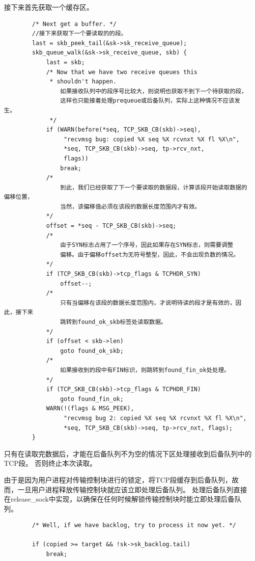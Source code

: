     接下来首先获取一个缓存区。
\begin{verbatim}
        /* Next get a buffer. */
        //接下来获取下一个要读取的的段。
        last = skb_peek_tail(&sk->sk_receive_queue);
        skb_queue_walk(&sk->sk_receive_queue, skb) {
            last = skb;
            /* Now that we have two receive queues this
             * shouldn't happen.
                如果接收队列中的段序号比较大，则说明也获取不到下一个待获取的段，
                这样也只能接着处理prequeue或后备队列，实际上这种情况不应该发生。
             */
            if (WARN(before(*seq, TCP_SKB_CB(skb)->seq),
                 "recvmsg bug: copied %X seq %X rcvnxt %X fl %X\n",
                 *seq, TCP_SKB_CB(skb)->seq, tp->rcv_nxt,
                 flags))
                break;
            /*
                到此，我们已经获取了下一个要读取的数据段，计算该段开始读取数据的偏移位置，
                当然，该偏移值必须在该段的数据长度范围内才有效。
            */
            offset = *seq - TCP_SKB_CB(skb)->seq;   
            /*
                由于SYN标志占用了一个序号，因此如果存在SYN标志，则需要调整
                偏移。由于偏移offset为无符号整型，因此，不会出现负数的情况。
            */
            if (TCP_SKB_CB(skb)->tcp_flags & TCPHDR_SYN)
                offset--;
            /*
                只有当偏移在该段的数据长度范围内，才说明待读的段才是有效的，因此，接下来
                跳转到found_ok_skb标签处读取数据。
            */
            if (offset < skb->len)
                goto found_ok_skb;
            /*
                如果接收到的段中有FIN标识，则跳转到found_fin_ok处处理。
            */
            if (TCP_SKB_CB(skb)->tcp_flags & TCPHDR_FIN)
                goto found_fin_ok;
            WARN(!(flags & MSG_PEEK),
                 "recvmsg bug 2: copied %X seq %X rcvnxt %X fl %X\n",
                 *seq, TCP_SKB_CB(skb)->seq, tp->rcv_nxt, flags);
        }
\end{verbatim}

    只有在读取完数据后，才能在后备队列不为空的情况下区处理接收到后备队列中的TCP段。
    否则终止本次读取。

    由于是因为用户进程对传输控制块进行的锁定，将TCP段缓存到后备队列，故而，一旦用户进程释放传输控制块就应该立即处理后备队列。
    处理后备队列直接在release\_sock中实现，以确保在任何时候解锁传输控制块时能立即处理后备队列。
\begin{verbatim}
        /* Well, if we have backlog, try to process it now yet. */

        if (copied >= target && !sk->sk_backlog.tail)
            break;
\end{verbatim}

